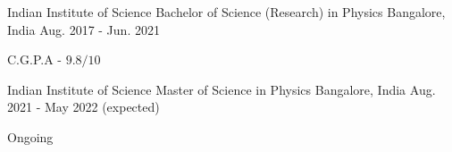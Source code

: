 

\begin{cventries}

  \cventry
    {Indian Institute of Science} %
    {Bachelor of Science (Research) in Physics} %
    {Bangalore, India} %
    {Aug. 2017 - Jun. 2021} %
    {
      \begin{cvitems} %
        \item {C.G.P.A - $9.8/10$}
      \end{cvitems}
    }
    \cventry
    {Indian Institute of Science} %
    {Master of Science in Physics} %
    {Bangalore, India} %
    {Aug. 2021 - May 2022 (expected)} %
{
	\begin{cvitems} %
		\item {Ongoing}
	\end{cvitems}
}



\end{cventries}
